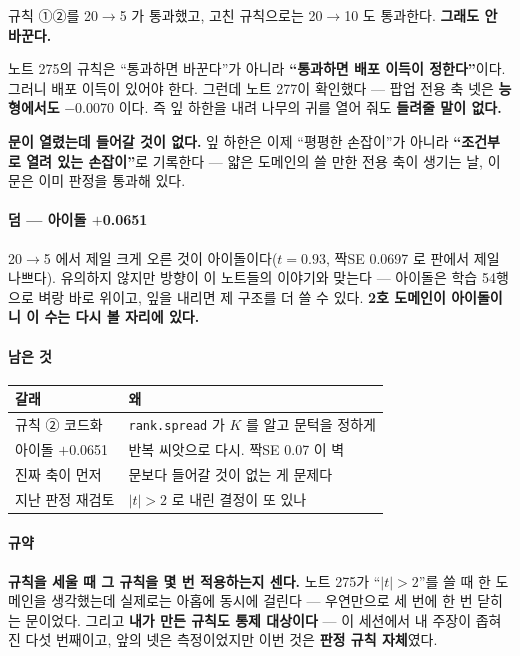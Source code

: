 \documentclass[10pt]{article}
\begin{document}
규칙 ①②를 20$\to$5 가 통과했고, 고친 규칙으로는 20$\to$10 도 통과한다.
\textbf{그래도 안 바꾼다.}

노트 275의 규칙은 ``통과하면 바꾼다''가 아니라 \textbf{``통과하면 배포
이득이 정한다''}이다. 그러니 배포 이득이 있어야 한다. 그런데 노트 277이
확인했다 --- 팝업 전용 축 넷은 \textbf{능형에서도} $-$0.0070 이다. 즉 잎
하한을 내려 나무의 귀를 열어 줘도 \textbf{들려줄 말이 없다.}

\textbf{문이 열렸는데 들어갈 것이 없다.} 잎 하한은 이제 ``평평한 손잡이''가
아니라 \textbf{``조건부로 열려 있는 손잡이''}로 기록한다 --- 얇은 도메인의
쓸 만한 전용 축이 생기는 날, 이 문은 이미 판정을 통과해 있다.

\paragraph{덤 --- 아이돌 $+$0.0651} 20$\to$5 에서 제일 크게 오른 것이
아이돌이다($t{=}0.93$, 짝SE 0.0697 로 판에서 제일 나쁘다). 유의하지 않지만
방향이 이 노트들의 이야기와 맞는다 --- 아이돌은 학습 54행으로 벼랑 바로
위이고, 잎을 내리면 제 구조를 더 쓸 수 있다. \textbf{2호 도메인이 아이돌이니
이 수는 다시 볼 자리에 있다.}

\paragraph{남은 것}
\begin{center}\small
\begin{tabular}{ll}
\hline
갈래 & 왜 \\
\hline
규칙 ② 코드화 & \texttt{rank.spread} 가 $K$ 를 알고 문턱을 정하게 \\
아이돌 $+$0.0651 & 반복 씨앗으로 다시. 짝SE 0.07 이 벽 \\
진짜 축이 먼저 & 문보다 들어갈 것이 없는 게 문제다 \\
지난 판정 재검토 & $|t|{>}2$ 로 내린 결정이 또 있나 \\
\hline
\end{tabular}
\end{center}

\paragraph{규약} \textbf{규칙을 세울 때 그 규칙을 몇 번 적용하는지 센다.}
노트 275가 ``$|t|{>}2$''를 쓸 때 한 도메인을 생각했는데 실제로는 아홉에
동시에 걸린다 --- 우연만으로 세 번에 한 번 닫히는 문이었다. 그리고
\textbf{내가 만든 규칙도 통제 대상이다} --- 이 세션에서 내 주장이 좁혀진
다섯 번째이고, 앞의 넷은 측정이었지만 이번 것은 \textbf{판정 규칙 자체}였다.
\end{document}
